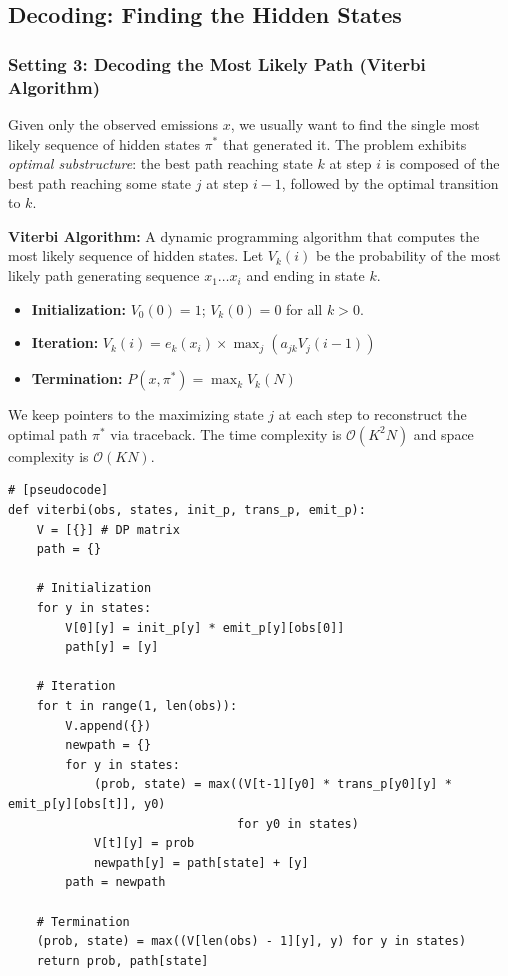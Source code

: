 
\subsection{Decoding: Finding the Hidden States}

\subsubsection{Setting 3: Decoding the Most Likely Path (Viterbi Algorithm)}

Given only the observed emissions \( x \), we usually want to find the single most likely sequence of hidden states \( \pi^* \) that generated it. The problem exhibits \textit{optimal substructure}: the best path reaching state $k$ at step $i$ is composed of the best path reaching some state $j$ at step $i-1$, followed by the optimal transition to $k$.

\begin{important}
  \textbf{Viterbi Algorithm:} A dynamic programming algorithm that computes the most likely sequence of hidden states. Let \( V_k(i) \) be the probability of the most likely path generating sequence $x_1 \dots x_i$ and ending in state $k$.
  \begin{itemize}
      \item \textbf{Initialization:} \( V_0(0) = 1 \); \( V_k(0) = 0 \) for all \( k > 0 \).
      \item \textbf{Iteration:} \( V_k(i) = e_k(x_i) \times \max_j (a_{jk} V_j(i-1)) \)
      \item \textbf{Termination:} \( P(x, \pi^*) = \max_k V_k(N) \)
  \end{itemize}
\end{important}

We keep pointers to the maximizing state \( j \) at each step to reconstruct the optimal path \(\pi^*\) via traceback. The time complexity is $\mathcal{O}(K^2N)$ and space complexity is $\mathcal{O}(KN)$.

\begin{verbatim}
# [pseudocode]
def viterbi(obs, states, init_p, trans_p, emit_p):
    V = [{}] # DP matrix
    path = {}
    
    # Initialization
    for y in states:
        V[0][y] = init_p[y] * emit_p[y][obs[0]]
        path[y] = [y]
        
    # Iteration
    for t in range(1, len(obs)):
        V.append({})
        newpath = {}
        for y in states:
            (prob, state) = max((V[t-1][y0] * trans_p[y0][y] * emit_p[y][obs[t]], y0) 
                                for y0 in states)
            V[t][y] = prob
            newpath[y] = path[state] + [y]
        path = newpath
        
    # Termination
    (prob, state) = max((V[len(obs) - 1][y], y) for y in states)
    return prob, path[state]
\end{verbatim}

